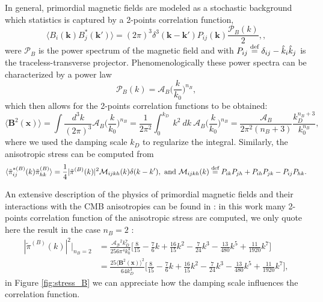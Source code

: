 In general, primordial magnetic fields are modeled as a stochastic background which statistics is captured by a 2-points correlation function,
\begin{equation}
    \langle B_i(\mathbf{k})B^*_j(\mathbf{k'})\rangle=(2\pi)^3\delta^3(\mathbf{k}-\mathbf{k'})P_{ij}(\mathbf{k})\frac{\mathcal P_B(k)}{2},\label{eq:magnetic_2pt},
\end{equation}
were $\mathcal P_B$ is the power spectrum of the magnetic field and with $P_{ij}\stackrel{\text{def}}{=} \delta_{ij} - \hat k_i\hat k_j$ is the traceless-transverse projector.  Phenomenologically these power spectra can be characterized by a power law
$$\mathcal{P}_B(k)=\mathcal A_B\bigg(\frac{k}{k_0}\bigg)^{n_B},$$
which then allows for the 2-points correlation functions to be obtained:
$$\big\langle \mathbf B^2(\mathbf{x})\big\rangle=\int \frac{d^3k}{(2\pi)^3}\mathcal A_B\bigg(\frac{k}{k_0}\bigg)^{n_B}=\frac{1}{2\pi^2}\int_0^{k_D}\ k^2\ dk\ \mathcal A_B\bigg(\frac{k}{k_0}\bigg)^{n_B}=\frac{\mathcal{A}_B }{2\pi^2(n_B+3)}\frac{k_D^{n_B+3}}{k_0^{n_B}},$$
where we used the damping scale $k_D$ to regularize the integral. Similarly, the anisotropic stress can be computed from
$$\langle\tilde\pi^{*(B)}_{ij}(k)\tilde\pi^{(B)}_{hk}\rangle=\frac{1}{4}|\tilde \pi^{(B)}(k)|^2\mathcal{M}_{ijkh}(k)\delta(k-k'),\text{ and }\mathcal{M}_{ijkh}(k)\stackrel{\text{def}}{=} P_{ik}P_{jh}+P_{ih}P_{jk}-P_{ij}P_{hk}.$$

An extensive description of the physics of primordial magnetic fields and their interactions with the CMB anisotropies can be found in \cite{Paoletti_2009}: in this work many 2-points correlation function of the anisotropic stress are computed, we only quote here the result in the case $n_B=2$ :
\begin{align*}
    |\tilde \pi^{(B)}(k)|^2\bigg|_{n_B=2}&=\frac{\mathcal{A_B}^2k_D^7}{256\pi^4k_0 ^4}\bigg[\frac{8}{15}-\frac{7}{6}k+\frac{16}{15}k^2-\frac{7}{24}k^3-\frac{13}{480}k^5+\frac{11}{1920}k^7\bigg]\\
    &=\frac{25\big\langle \mathbf B^2(\mathbf{x})\big\rangle^2}{64k_D^3}\bigg[\frac{8}{15}-\frac{7}{6}k+\frac{16}{15}k^2-\frac{7}{24}k^3-\frac{13}{480}k^5+\frac{11}{1920}k^7\bigg],
\end{align*}
in Figure \ref{fig:stress_B} we can appreciate how the damping scale influences the correlation function.



